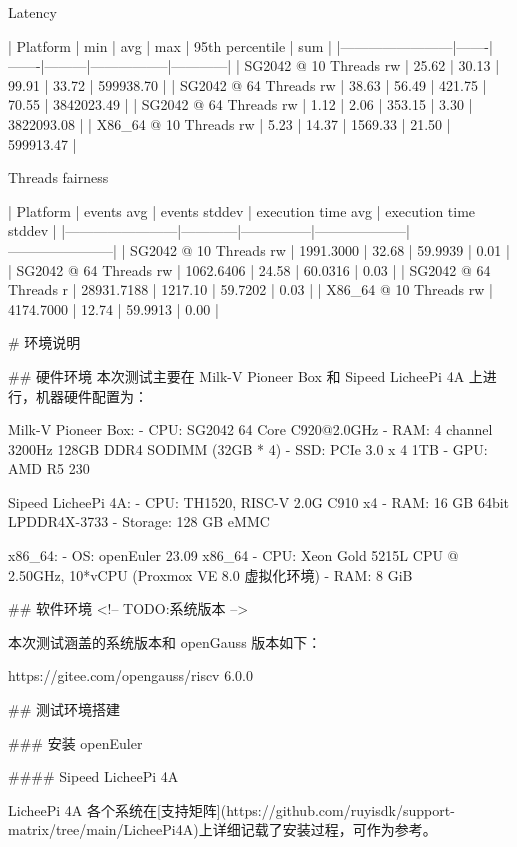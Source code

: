 \documentclass{article}
\begin{document}
\begin{markdown}
Latency

| Platform               | min   | avg   | max     | 95th percentile | sum        |
|------------------------|-------|-------|---------|-----------------|------------|
| SG2042 @ 10 Threads rw | 25.62 | 30.13 | 99.91   | 33.72           | 599938.70  |
| SG2042 @ 64 Threads rw | 38.63 | 56.49 | 421.75  | 70.55           | 3842023.49 |
| SG2042 @ 64 Threads rw | 1.12  | 2.06  | 353.15  | 3.30            | 3822093.08 |
| X86_64 @ 10 Threads rw | 5.23  | 14.37 | 1569.33 | 21.50           | 599913.47  |


Threads fairness

| Platform               | events avg | events stddev | execution time avg | execution time stddev |
|------------------------|------------|---------------|--------------------|-----------------------|
| SG2042 @ 10 Threads rw | 1991.3000  | 32.68         | 59.9939            | 0.01                  |
| SG2042 @ 64 Threads rw | 1062.6406  | 24.58         | 60.0316            | 0.03                  |
| SG2042 @ 64 Threads r  | 28931.7188 | 1217.10       | 59.7202            | 0.03                  |
| X86_64 @ 10 Threads rw | 4174.7000  | 12.74         | 59.9913            | 0.00                  |




# 环境说明

## 硬件环境
本次测试主要在 Milk-V Pioneer Box 和 Sipeed LicheePi 4A 上进行，机器硬件配置为：

Milk-V Pioneer Box:
- CPU: SG2042 64 Core C920@2.0GHz
- RAM: 4 channel 3200Hz 128GB DDR4 SODIMM (32GB * 4)
- SSD: PCIe 3.0 x 4 1TB
- GPU: AMD R5 230

Sipeed LicheePi 4A:
- CPU: TH1520, RISC-V 2.0G C910 x4
- RAM: 16 GB 64bit LPDDR4X-3733
- Storage: 128 GB eMMC

x86_64:
- OS: openEuler 23.09 x86_64
- CPU: Xeon Gold 5215L CPU @ 2.50GHz, 10*vCPU (Proxmox VE 8.0 虚拟化环境)
- RAM: 8 GiB

## 软件环境
<!-- TODO:系统版本 -->

本次测试涵盖的系统版本和 openGauss 版本如下：

https://gitee.com/opengauss/riscv 6.0.0

## 测试环境搭建

### 安装 openEuler

#### Sipeed LicheePi 4A

LicheePi 4A 各个系统在[支持矩阵](https://github.com/ruyisdk/support-matrix/tree/main/LicheePi4A)上详细记载了安装过程，可作为参考。


\end{markdown}
\end{document}

